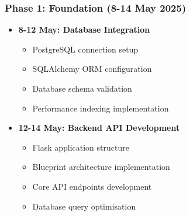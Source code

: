 \documentclass[11pt,a4paper]{article}
\begin{document}
\subsubsection{Phase 1: Foundation (8-14 May 2025)}
\begin{itemize}
    \item \textbf{8-12 May: Database Integration}
    \begin{itemize}
        \item PostgreSQL connection setup
        \item SQLAlchemy ORM configuration
        \item Database schema validation
        \item Performance indexing implementation
    \end{itemize}
    \item \textbf{12-14 May: Backend API Development}
    \begin{itemize}
        \item Flask application structure
        \item Blueprint architecture implementation
        \item Core API endpoints development
        \item Database query optimisation
    \end{itemize}
\end{itemize}
\end{document}
